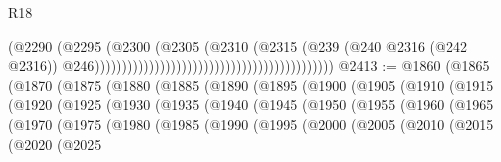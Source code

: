 \begin{lexlean}{R18}
\begin{coremodule}
                                                                              (@2290
                                                                                (@2295
                                                                                  (@2300
                                                                                    (@2305
                                                                                      (@2310
                                                                                        (@2315
                                                                                          (@239
                                                                                            (@240
                                                                                              @2316
                                                                                              (@242
                                                                                                @2316))
                                                                                            @246))))))))))))))))))))))))))))))))))))))))))))
@2413 := @1860
    (@1865
      (@1870
        (@1875
          (@1880
            (@1885
              (@1890
                (@1895
                  (@1900
                    (@1905
                      (@1910
                        (@1915
                          (@1920
                            (@1925
                              (@1930
                                (@1935
                                  (@1940
                                    (@1945
                                      (@1950
                                        (@1955
                                          (@1960
                                            (@1965
                                              (@1970
                                                (@1975
                                                  (@1980
                                                    (@1985
                                                      (@1990
                                                        (@1995
                                                          (@2000
                                                            (@2005
                                                              (@2010
                                                                (@2015
                                                                  (@2020
                                                                    (@2025

\end{coremodule}
\end{lexlean}
